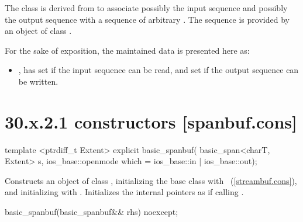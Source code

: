 \documentclass[ebook,11pt,article]{memoir}
\begin{document}
\pnum
The class
is derived from
to associate possibly the input sequence and possibly
the output sequence with a sequence of arbitrary
.
The sequence is provided by an object of class
.

\pnum
For the sake of exposition, the maintained data is presented here as:
\begin{itemize}
\item
{},
has
set if the input sequence can be read, and
set if the output sequence can be written.
\end{itemize}

\section{30.x.2.1  constructors [spanbuf.cons]}

%
\begin{itemdecl}
template <ptrdiff_t Extent>
explicit basic_spanbuf(
  basic_span<charT, Extent> s,
  ios_base::openmode which = ios_base::in | ios_base::out);
\end{itemdecl}

\begin{itemdescr}
\pnum
\effects
Constructs an object of class
,
initializing the base class with
~(\ref{streambuf.cons}), and initializing
with . 
Initializes the internal pointers as if calling .
\end{itemdescr}

%
\begin{itemdecl}
basic_spanbuf(basic_spanbuf&& rhs) noexcept;
\end{itemdecl}
\end{document}
